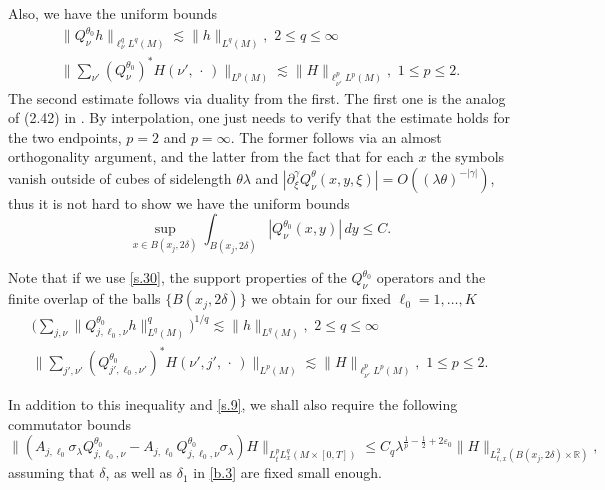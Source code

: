 \documentclass[10pt]{amsart}
\newcommand{\la}{\lambda}
\newcommand{\e}{\varepsilon}
\newcommand{\1}{{\bf 1}}
\newcommand{\R}{{\mathbb R}}
\begin{document}
Also, we have the uniform bounds
\begin{equation}\label{s.30}
\begin{split}
\|Q^{\theta_0}_\nu h\|_{\ell^q_\nu L^q(M)}\lesssim \|h\|_{L^q(M)}, \, \, 2\le q\le \infty
\\
\bigl\| \sum_{\nu'}(Q^{\theta_0}_\nu)^*H(\nu', \, \cdot \, )\|_{L^p(M)}\lesssim 
\|H\|_{\ell^p_{\nu'}L^p(M)}, \, \, 1\le p\le 2.
\end{split}
\end{equation}
The second estimate follows via duality from the first.  The first one is the analog of (2.42) in \cite{HSst}.  By interpolation,
one just needs to verify that the estimate holds for the two endpoints, $p=2$ and $p=\infty$.  The former follows via an almost
orthogonality argument, and the latter from the fact that 
for each $x$ the symbols vanish outside of cubes of sidelength $\theta \la$ and 
$| \partial^\gamma_\xi Q^\theta_\nu(x,y,\xi)|=O((\la\theta)^{-|\gamma|})$, thus it is not hard to show we have the uniform bounds
$$\sup_{x\in B(x_j,2\delta)}\int_{B(x_j,2\delta)}|Q^{\theta_0}_\nu(x,y)| \, dy\le C.$$




Note that if we use \eqref{s.30}, the support properties of the $Q_\nu^{\theta_0}$ operators and the finite overlap of the balls $\{B(x_j,2\delta)\}$ we obtain
for our fixed $\ell_0=1,\dots,K$
\begin{equation}\label{s.31}
\begin{split}
\bigl(\sum_{j,\nu}\|Q^{\theta_0}_{j,\ell_0,\nu} h\|_{ L^q(M)}^q\bigr)^{1/q}\lesssim \|h\|_{L^q(M)}, \, \, 2\le q\le \infty
\\
\bigl\| \sum_{j',\nu'}(Q^{\theta_0}_{j',\ell_0,\nu'})^*H(\nu',j', \, \cdot \, )\|_{L^p(M)}\lesssim 
\|H\|_{\ell^p_{\nu'}L^p(M)}, \, \, 1\le p\le 2.
\end{split}
\end{equation}


In addition to this inequality and \eqref{s.9}, we shall also require the following commutator bounds
\begin{equation}\label{comms}
\bigl\| (A_{j,\ell_0}\sigma_\la Q^{\theta_0}_{j,\ell_0,\nu}-A_{j,\ell_0}Q^{\theta_0}_{j,\ell_0,\nu}\sigma_\la)H\|_{L^p_tL^q_x(M\times [0,T])}
\le C_q \la^{\frac1p-\frac12+2\e_0}\|H\|_{L^2_{t,x}(B(x_j,2\delta)\times \R)},
\end{equation}
assuming that $\delta$, as well as $\delta_1$ in \eqref{b.3} are fixed small enough.  
\end{document}
